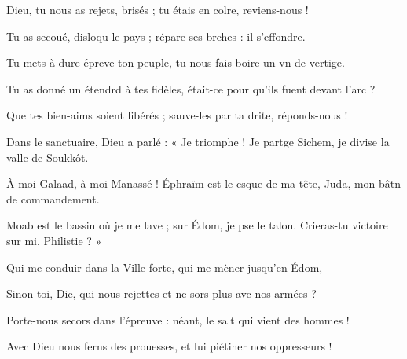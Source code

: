\item Dieu, tu nous as rejets, brisés ;\psstar{} tu étais en colre, reviens-nous !
\item Tu as secoué, disloqu le pays ;\psstar{} répare ses brches : il s’effondre.
\item Tu mets à dure épreve ton peuple,\psstar{} tu nous fais boire un vn de vertige.
\item Tu as donné un étendrd à tes fidèles,\psstar{} était-ce pour qu’ils fuent devant l’arc ?
\item Que tes bien-aims soient libérés ;\psstar{} sauve-les par ta drite, réponds-nous !
\item Dans le sanctuaire, Dieu a parlé :\pscross{} « Je triomphe ! Je partge Sichem,\psstar{} je divise la valle de Soukkôt.
\item À moi Galaad, à moi Manassé !\pscross{} Éphraïm est le csque de ma tête,\psstar{} Juda, mon bâtn de commandement.
\item Moab est le bassin où je me lave ;\pscross{} sur Édom, je pse le talon.\psstar{} Crieras-tu victoire sur mi, Philistie ? »
\item Qui me conduir dans la Ville-forte,\psstar{} qui me mèner jusqu’en Édom,
\item Sinon toi, Die, qui nous rejettes\psstar{} et ne sors plus avc nos armées ?
\item Porte-nous secors dans l’épreuve :\psstar{} néant, le salt qui vient des hommes !
\item Avec Dieu nous ferns des prouesses,\psstar{} et lui piétiner nos oppresseurs !